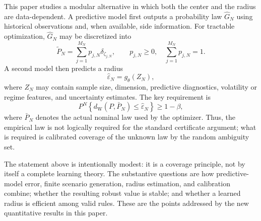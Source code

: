 \documentclass[11pt]{article}
\newcommand{\1}{\mathbf{1}}
\newcommand{\dW}{d_{\mathrm W}}
\newcommand{\Ptil}{\widetilde P_N}
\newcommand{\Pbar}{\bar P_N}
\newcommand{\epshat}{\widehat\varepsilon_N}
\begin{document}
This paper studies a modular alternative in which both the center and the radius are data-dependent. A predictive model first outputs a probability law $\widehat G_N$ using historical observations and, when available, side information. For tractable optimization, $\widehat G_N$ may be discretized into
\begin{equation}\label{eq:predictive-dist}
    \Ptil = \sum_{j=1}^{M_N}p_{j,N}\delta_{\zeta_{j,N}},\qquad p_{j,N}\ge0,\quad \sum_{j=1}^{M_N}p_{j,N}=1.
\end{equation}
A second model then predicts a radius
\begin{equation}\label{eq:learned-radius-intro}
    \epshat = g_\theta(Z_N),
\end{equation}
where $Z_N$ may contain sample size, dimension, predictive diagnostics, volatility or regime features, and uncertainty estimates. The key requirement is
\begin{equation}\label{eq:coverage-intro}
    P^N\left\{\dW(P,\Pbar)\le \epshat\right\}\ge1-\beta,
\end{equation}
where $\Pbar$ denotes the actual nominal law used by the optimizer. Thus, the empirical law is not logically required for the standard certificate argument; what is required is calibrated coverage of the unknown law by the random ambiguity set.

The statement above is intentionally modest: it is a coverage principle, not by itself a complete learning theory. The substantive questions are how predictive-model error, finite scenario generation, radius estimation, and calibration combine; whether the resulting robust value is stable; and whether a learned radius is efficient among valid rules. These are the points addressed by the new quantitative results in this paper.
\end{document}
